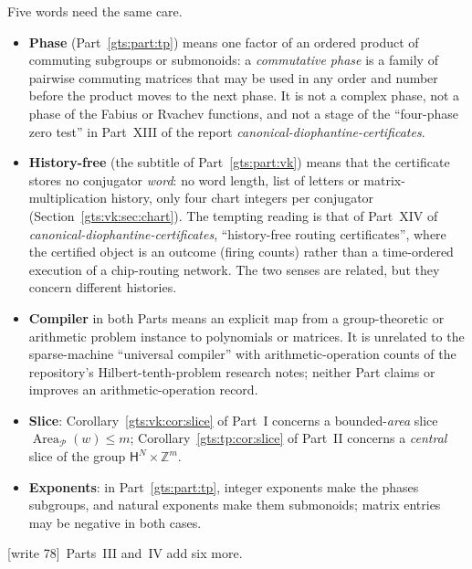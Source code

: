 \documentclass[11pt,letterpaper]{article}
\theoremstyle{definition}
\theoremstyle{remark}
\newcommand{\Z}{\mathbb Z}
\newcommand{\Pp}{\mathcal P}
\newcommand{\Area}{\operatorname{Area}}
\newcommand{\HH}{\mathsf H}
\newcommand{\wtagb}{\textup{[write 78]}}
\begin{document}
Five words need the same care.
\begin{itemize}
\item \textbf{Phase} (Part~\ref{gts:part:tp}) means one factor of an ordered product of commuting subgroups or submonoids: a \emph{commutative phase} is a family of pairwise commuting matrices that may be used in any order and number before the product moves to the next phase. It is not a complex phase, not a phase of the Fabius or Rvachev functions, and not a stage of the ``four-phase zero test'' in Part~XIII of the report \emph{canonical-diophantine-certificates}.
\item \textbf{History-free} (the subtitle of Part~\ref{gts:part:vk}) means that the certificate stores no conjugator \emph{word}: no word length, list of letters or matrix-multiplication history, only four chart integers per conjugator (Section~\ref{gts:vk:sec:chart}). The tempting reading is that of Part~XIV of \emph{canonical-diophantine-certificates}, ``history-free routing certificates'', where the certified object is an outcome (firing counts) rather than a time-ordered execution of a chip-routing network. The two senses are related, but they concern different histories.
\item \textbf{Compiler} in both Parts means an explicit map from a group-theoretic or arithmetic problem instance to polynomials or matrices. It is unrelated to the sparse-machine ``universal compiler'' with arithmetic-operation counts of the repository's Hilbert-tenth-problem research notes; neither Part claims or improves an arithmetic-operation record.
\item \textbf{Slice}: Corollary~\ref{gts:vk:cor:slice} of Part~I concerns a bounded-\emph{area} slice $\Area_{\Pp}(w)\leq m$; Corollary~\ref{gts:tp:cor:slice} of Part~II concerns a \emph{central} slice of the group $\HH^N\times\Z^m$.
\item \textbf{Exponents}: in Part~\ref{gts:part:tp}, integer exponents make the phases subgroups, and natural exponents make them submonoids; matrix entries may be negative in both cases.
\end{itemize}
\wtagb\ Parts~III and~IV add six more.
\end{document}
